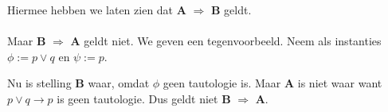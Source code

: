 \documentclass[a4paper,11pt]{article}
\begin{document}
Hiermee hebben we laten zien dat \textbf{A} $\Rightarrow$ \textbf{B} geldt.

\paragraph{}

Maar \textbf{B} $\Rightarrow$ \textbf{A} geldt niet. We geven een tegenvoorbeeld.
Neem als instanties $\phi := p \vee q$ en $\psi := p$.

Nu is stelling \textbf{B} waar, omdat $\phi$ geen tautologie is. Maar \textbf{A}
is niet waar want $p \vee q \rightarrow p$ is geen tautologie. Dus geldt
niet \textbf{B} $\Rightarrow$ \textbf{A}.
\end{document}
